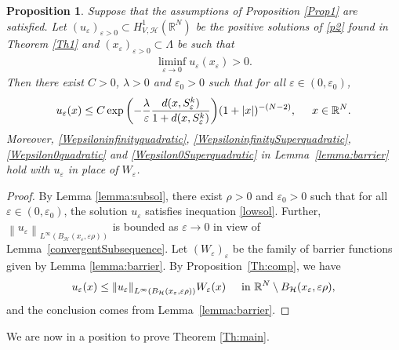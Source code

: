 \documentclass[a4paper]{amsart}
\newtheorem{proposition}{Proposition}[section]
\begin{document}
\begin{proposition}\label{Prop:decay}
 Suppose that the assumptions of Proposition \ref{Prop1} are satisfied. Let $(u_{\varepsilon})_{\varepsilon>0} \subset
H^1_{V,\mathcal{H}}({\mathbb{R}}^N)$ be the positive solutions of \eqref{p2} found in Theorem \ref{Th1} and
$(x_{\varepsilon})_{\varepsilon>0} \subset \Lambda$ be such that
\begin{align*}
 \liminf_{\varepsilon\to 0} u_{\varepsilon}(x_{\varepsilon}) > 0.
\end{align*}
Then there exist $C>0$, $\lambda > 0$ and $\varepsilon_0>0$ such that for all $\varepsilon \in (0,\varepsilon_0)$,
\begin{align}\label{decay}
 u_{\varepsilon}(x) \leq C \exp{\left( -\frac{\lambda}{\varepsilon} \frac{d(x,S^k_{\varepsilon})}{1+d(x,S^k_{\varepsilon})}\right)}
( 1+{\left| {x} \right|} )^{-(N-2)}, \hspace{0.5cm} x \in {\mathbb{R}}^N.
\end{align}
Moreover, \eqref{Wepsiloninfinityquadratic}, \eqref{WepsiloninfinitySuperquadratic}, \eqref{Wepsilon0quadratic} and
\eqref{Wepsilon0Superquadratic} in Lemma~\ref{lemma:barrier} hold with $u_\varepsilon$ in place of $W_\varepsilon$.
\end{proposition}
\begin{proof}
By Lemma \ref{lemma:subsol}, there exist $\rho > 0$ and $\varepsilon_0>0$ such that for all $\varepsilon \in (0,\varepsilon_0)$,
the
solution $u_{\varepsilon}$ satisfies inequation \eqref{lowsol}. Further, ${\left\| {u_{\varepsilon}} \right\|}_{L^\infty
(B_\mathcal{H}(x_{\varepsilon},\varepsilon \rho))}$ is bounded as $\varepsilon \to 0$ in view of
Lemma~\ref{convergentSubsequence}.
Let
$(W_{\varepsilon})_{\varepsilon}$ be the family of barrier functions given by Lemma \ref{lemma:barrier}. By
Proposition~\ref{Th:comp}, we have
\begin{align*}
 u_{\varepsilon}(x) \leq {\left\| {u_{\varepsilon}} \right\|}_{L^\infty (B_\mathcal{H}(x_{\varepsilon},\varepsilon \rho))} W_{\varepsilon}(x)
\hspace{0.5cm} \text{in}\ {\mathbb{R}}^N\setminus B_\mathcal{H} (x_{\varepsilon},\varepsilon \rho),
\end{align*}
and the conclusion comes from Lemma~\ref{lemma:barrier}.
\end{proof}

\bigbreak

We are now in a position to prove Theorem \ref{Th:main}.
\end{document}
